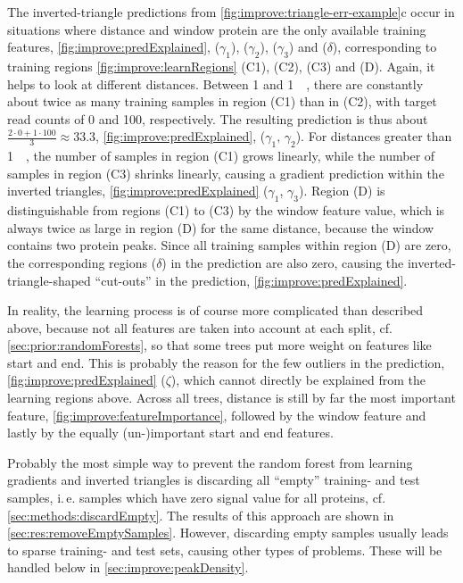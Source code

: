 The inverted-triangle predictions from \autoref{fig:improve:triangle-err-example}c occur in situations 
where distance and window protein are the only available training features, 
\autoref{fig:improve:predExplained}, ($\gamma_1$), ($\gamma_2$), ($\gamma_3$) and ($\delta$),
corresponding to training regions \autoref{fig:improve:learnRegions} (C1), (C2), (C3) and (D).
Again, it helps to look at different distances. Between \SI{1}{\bp} and \SI{1}{\mega\bp},
there are constantly about twice as many training samples
in region (C1) than in (C2), with target read counts of 0 and 100, respectively. 
The resulting prediction is thus about $\frac{2 \cdot 0 + 1 \cdot 100}{3} \approx 33.3$, \autoref{fig:improve:predExplained}, ($\gamma_1,\,\gamma_2$). 
For distances greater than \SI{1}{\mega\bp}, the number of samples in region (C1) grows linearly, 
while the number of samples in region (C3) shrinks linearly, causing a gradient prediction within the inverted triangles, 
\autoref{fig:improve:predExplained} ($\gamma_1$, $\gamma_3$).
Region (D) is distinguishable from regions (C1) to (C3) by the window feature value, 
which is always twice as large in region (D) for the same distance, because the window contains two protein peaks.
Since all training samples within region (D) are zero, 
the corresponding regions ($\delta$) in the prediction are also zero,
causing the inverted-triangle-shaped ``cut-outs'' in the prediction, \autoref{fig:improve:predExplained}.

In reality, the learning process is of course more complicated than described above, 
because not all features are taken into account at each split, cf.\;\autoref{sec:prior:randomForests}, 
so that some trees put more weight on features like start and end.
This is probably the reason for the few outliers in the prediction, \autoref{fig:improve:predExplained} ($\zeta$), 
which cannot directly be explained from the learning regions above.
Across all trees, distance is still by far the most important feature, \autoref{fig:improve:featureImportance},
followed by the window feature and lastly by the equally (un-)important start and end features.

Probably the most simple way to prevent the random forest from learning gradients and inverted triangles 
is discarding all ``empty'' training- and test samples, i.\,e. samples which have zero signal value for all proteins, cf.\;\autoref{sec:methods:discardEmpty}.
The results of this approach are shown in \autoref{sec:res:removeEmptySamples}.
However, discarding empty samples usually leads to sparse training- and test sets, causing other types of problems.
These will be handled below in \autoref{sec:improve:peakDensity}.

